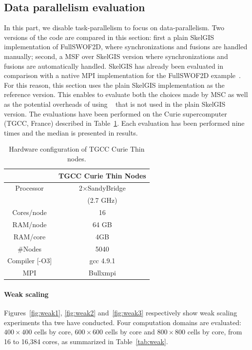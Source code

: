 \subsection{Data parallelism evaluation}

In this part, we disable task-parallelism to focus on data-parallelism. Two versions of the code are compared in this section: first a plain SkelGIS implementation of FullSWOF2D, where synchronizations and fusions are handled manually; second, a MSF over SkelGIS version where  synchronizations and fusions are automatically handled. SkelGIS has already been evaluated in comparison with a native MPI implementation for the FullSWOF2D example~\cite{CPE:CPE3494}. For this reason, this section uses the plain SkelGIS implementation as the reference version. This enables to evaluate both the choices made by MSC as well as the potential overheads of using \llc~\cite{l2c} that is not used in the plain SkelGIS version. The evaluations have been performed on the Curie supercomputer (TGCC, France) described in Table~\ref{tab:TGCC}. Each evaluation has been performed nine times and the median is presented in results.

\begin{table}[!ht]
\begin{center}
 \begin{tabular}{|c|c|}
     & TGCC Curie Thin Nodes\\
     \hline         
    Processor & 2$\times$SandyBridge\\
    & (2.7 GHz)\\
    Cores/node & 16 \\
    RAM/node & 64 GB\\
    RAM/core & 4GB\\
    \#Nodes & 5040 \\
    Compiler [-O3] & gcc 4.9.1\\
    MPI & Bullxmpi\\
 \end{tabular}
 \caption{\label{tab:TGCC}Hardware configuration of TGCC Curie Thin nodes.}
 \end{center}
\end{table}

\paragraph{\textbf{Weak scaling}}
Figures~\ref{fig:weak1}, \ref{fig:weak2} and~\ref{fig:weak3} respectively show weak scaling experiments tha twe have conducted. Four computation domains are evaluated: $400 \times 400$ cells by core, $600 \times 600$ cells by core and $800 \times 800$ cells by core, from 16 to 16,384 cores, as summarized in Table~\ref{tab:weak}.

